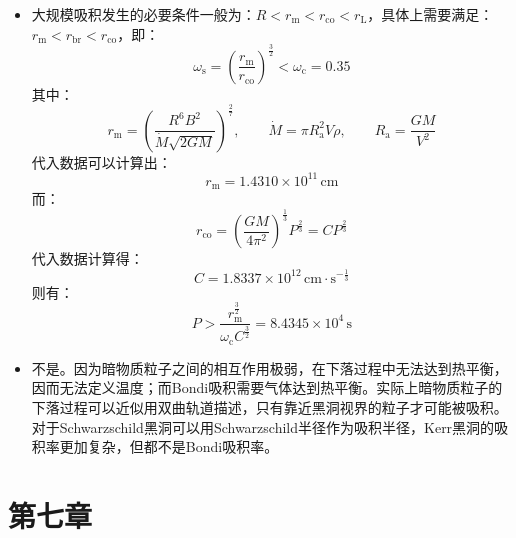 \documentclass[a4paper,fontset=none]{ctexart}
\begin{document}
\begin{itemize}
        \item[3.]
        大规模吸积发生的必要条件一般为：$R<r_{\mathrm{m}}<r_{\mathrm{co}}<r_{\mathrm{L}}$，具体上需要满足：$r_{\mathrm{m}}<r_{\mathrm{br}}<r_{\mathrm{co}}$，即：
        \[
        \omega_{\mathrm{s}} = \left(\frac{r_{\mathrm{m}}}{r_{\mathrm{co}}}\right)^{\tfrac{3}{2}} < \omega_{\mathrm{c}} = 0.35
        \]
        其中：
        \[
        r_{\mathrm{m}} = \left({\frac{R^6 B^2}{\dot{M}\sqrt{2GM}}}\right)^{\tfrac{2}{7}},\qquad
        \dot{M} = \pi R_{\mathrm{a}}^2 V\rho,\qquad
        R_{\mathrm{a}} = \frac{GM}{V^2}
        \]
        代入数据可以计算出：
        \[
        r_{\mathrm{m}} = 1.4310\times10^{11}\,\mathrm{cm}
        \]
        而：
        \[
        r_{\mathrm{co}} = \left(\frac{GM}{4\pi^2}\right)^{\tfrac{1}{3}}P^{\tfrac{2}{3}} = CP^{\tfrac{2}{3}}
        \]
        代入数据计算得：
        \[
        C = 1.8337\times10^{12}\,\mathrm{cm \cdot s^{-\tfrac{1}{3}}}
        \]
        则有：
        \[
        P > \frac{r_{\mathrm{m}}^{\tfrac{3}{2}}}{\omega_{\mathrm{c}}C^{\tfrac{3}{2}}} = 8.4345\times10^{4}\,\mathrm{s}
        \]

        \item[\textbf{补充题}]
        不是。因为暗物质粒子之间的相互作用极弱，在下落过程中无法达到热平衡，因而无法定义温度；而Bondi吸积需要气体达到热平衡。实际上暗物质粒子的下落过程可以近似用双曲轨道描述，只有靠近黑洞视界的粒子才可能被吸积。对于Schwarzschild黑洞可以用Schwarzschild半径作为吸积半径，Kerr黑洞的吸积率更加复杂，但都不是Bondi吸积率。

    \end{itemize}

    \section*{第七章}
\end{document}
